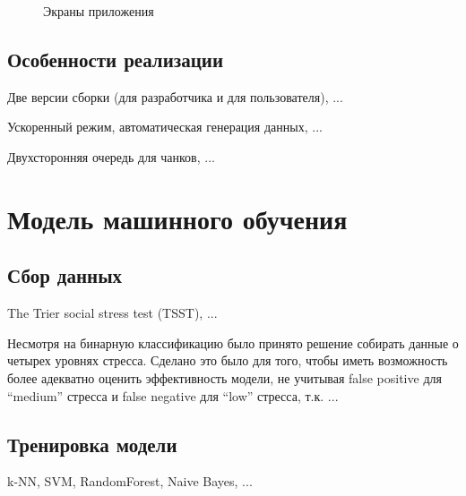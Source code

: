 \documentclass[14pt]{matmex-diploma-custom}
\begin{document}
\begin{figure}[ht!]
\begin{center}
{      \label{screenshot:stats}
    } 
  \end{center}
	\caption{Экраны приложения}
	\label{screenshots}
\end{figure}

\subsection{Особенности реализации}
Две версии сборки (для разработчика и для пользователя), ...

Ускоренный режим, автоматическая генерация данных, ...

Двухсторонняя очередь для чанков, ...

\section{Модель машинного обучения}
\subsection{Сбор данных}
The Trier social stress test (TSST), ...

Несмотря на бинарную классификацию было принято решение собирать данные о
четырех уровнях стресса. Сделано это было для того, чтобы иметь возможность
более адекватно оценить эффективность модели, не учитывая false positive для
``medium'' стресса и false negative для ``low'' стресса, т.к. ...

\subsection{Тренировка модели}
k-NN, SVM, RandomForest, Naive Bayes, ...
\end{document}
